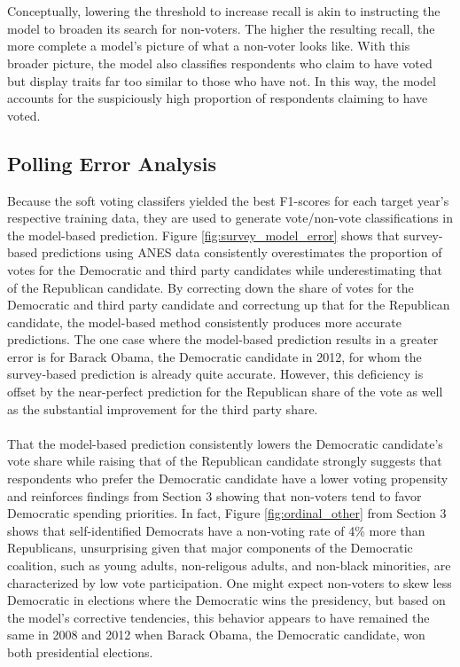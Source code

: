 \documentclass{article}
\begin{document}
	\\\\
	Conceptually, lowering the threshold to increase recall is akin to instructing the model to broaden its search for non-voters. The higher the resulting recall, the more complete a model's picture of what a non-voter looks like. With this broader picture, the model also classifies respondents who claim to have voted but display traits far too similar to those who have not. In this way, the model accounts for the suspiciously high proportion of respondents claiming to have voted.
	
	\subsection{Polling Error Analysis}
	
	Because the soft voting classifers yielded the best F1-scores for each target year's respective training data, they are used to generate vote/non-vote classifications in the model-based prediction. Figure \ref{fig:survey_model_error} shows that survey-based predictions using ANES data consistently overestimates the proportion of votes for the Democratic and third party candidates while underestimating that of the Republican candidate. By correcting down the share of votes for the Democratic and third party candidate and correctung up that for the Republican candidate, the model-based method consistently produces more accurate predictions. The one case where the model-based prediction results in a greater error is for Barack Obama, the Democratic candidate in 2012, for whom the survey-based prediction is already quite accurate. However, this deficiency is offset by the near-perfect prediction for the Republican share of the vote as well as the substantial improvement for the third party share.
	\\\\
	That the model-based prediction consistently lowers the Democratic candidate's vote share while raising that of the Republican candidate strongly suggests that respondents who prefer the Democratic candidate have a lower voting propensity and reinforces findings from Section 3 showing that non-voters tend to favor Democratic spending priorities. In fact, Figure \ref{fig:ordinal_other} from Section 3 shows that self-identified Democrats have a non-voting rate of 4\% more than Republicans, unsurprising given that major components of the Democratic coalition, such as young adults, non-religous adults, and non-black minorities, are characterized by low vote participation. One might expect non-voters to skew less Democratic in elections where the Democratic wins the presidency, but based on the model's corrective tendencies, this behavior appears to have remained the same in 2008 and 2012 when Barack Obama, the Democratic candidate, won both presidential elections.\\
\end{document}
